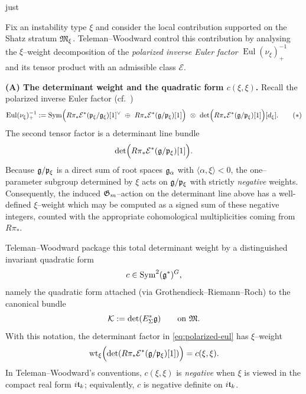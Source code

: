 just \documentclass[12pt]{article}
\DeclareMathOperator{\Eul}{Eul}
\begin{document}
Fix an instability type $\xi$ and consider the local contribution supported on the Shatz stratum
$\mathfrak{M}_\xi$.  Teleman--Woodward control this contribution by analysing the
$\xi$--weight decomposition of the \emph{polarized inverse Euler factor}
$\Eul(\nu_\xi)^{-1}_+$ and its tensor product with an admissible class
$\mathcal E$.

\medskip
\noindent\textbf{(A) The determinant weight and the quadratic form $c(\xi,\xi)$.}
Recall the polarized inverse Euler factor (cf.\ \cite[\S1.10--1.11]{TelemanWoodward})
\begin{equation}
\label{eq:polarized-eul}
\Eul(\nu_\xi)^{-1}_+
:=
\Sym\Bigl(
R\pi_*\mathcal E^*(\mf p_\xi/\mf g_\xi)[1]^\vee
\ \oplus\
R\pi_*\mathcal E^*(\mf g/\mf p_\xi)[1]
\Bigr)\ \otimes\
\det\Bigl(R\pi_*\mathcal E^*(\mf g/\mf p_\xi)[1]\Bigr)[d_\xi].
\tag{$\ast$}
\end{equation}
The second tensor factor is a determinant line bundle
\[
\det\Bigl(R\pi_*\mathcal E^*(\mathfrak{g}/\mathfrak{p}_\xi)[1]\Bigr).
\]
Because $\mathfrak{g}/\mathfrak{p}_\xi$ is a direct sum of root spaces $\mathfrak{g}_\alpha$ with
$\langle\alpha,\xi\rangle<0$, the one--parameter subgroup determined by $\xi$
acts on $\mathfrak{g}/\mathfrak{p}_\xi$ with strictly \emph{negative} weights.  Consequently,
the induced $\mathfrak{G}_m$--action on the determinant line above has a well-defined
$\xi$--weight which may be computed as a signed sum of these negative integers,
counted with the appropriate cohomological multiplicities coming from
$R\pi_*$.

Teleman--Woodward package this total determinant weight by a distinguished
invariant quadratic form
\[
c\in \operatorname{Sym}^2(\mathfrak{g}^*)^G,
\]
namely the quadratic form attached (via Grothendieck--Riemann--Roch) to the
canonical bundle
\[
\mathcal K := \det(E_\Sigma^*\mathfrak{g})
\qquad\text{on }\mathfrak{M}.
\]
With this notation, the determinant factor in \eqref{eq:polarized-eul} has
$\xi$--weight
\begin{equation}
\label{eq:weight-is-c}
\operatorname{wt}_\xi\Bigl(\det(R\pi_*\mathcal E^*(\mathfrak{g}/\mathfrak{p}_\xi)[1])\Bigr)=c(\xi,\xi).
\end{equation}
In Teleman--Woodward's conventions, $c(\xi,\xi)$ is \emph{negative} when $\xi$
is viewed in the compact real form $i\mathfrak{t}_k$; equivalently, $c$ is negative
definite on $i\mathfrak{t}_k$.
\end{document}
